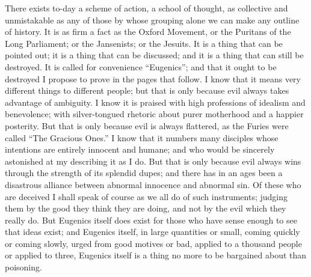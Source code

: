 \documentclass{book}
\begin{document}
There exists to-day a scheme of action, a school of thought, as collective and unmistakable as any of those by whose grouping alone we can make any outline of history. It is as firm a fact as the Oxford Movement, or the Puritans of the Long Parliament; or the Jansenists; or the Jesuits. It is a thing that can be pointed out; it is a thing that can be discussed; and it is a thing that can still be destroyed. It is called for convenience “Eugenics”; and that it ought to be destroyed I propose to prove in the pages that follow. I know that it means very different things to different people; but that is only because evil always takes advantage of ambiguity. I know it is praised with high professions of idealism and benevolence; with silver-tongued rhetoric about purer motherhood and a happier posterity. But that is only because evil is always flattered, as the Furies were called “The Gracious Ones.” I know that it numbers many disciples whose intentions are entirely innocent and humane; and who would be sincerely astonished at my describing it as I do. But that is only because evil always wins through the strength of its splendid dupes; and there has in an ages been a disastrous alliance between abnormal innocence and abnormal sin. Of these who are deceived I shall speak of course as we all do of such instruments; judging them by the good they think they are doing, and not by the evil which they really do. But Eugenics itself does exist for those who have sense enough to see that ideas exist; and Eugenics itself, in large quantities or small, coming quickly or coming slowly, urged from good motives or bad, applied to a thousand people or applied to three, Eugenics itself is a thing no more to be bargained about than poisoning.
\end{document}
